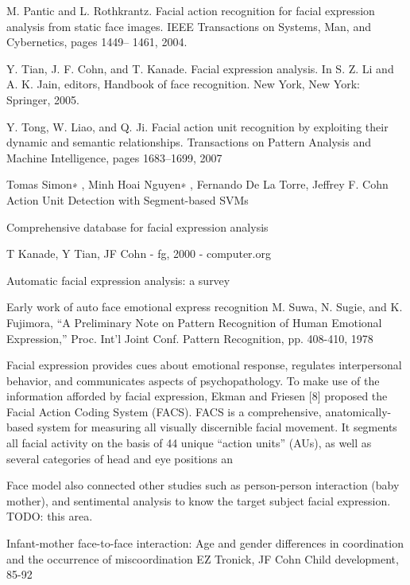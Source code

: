 M. Pantic and L. Rothkrantz. Facial action recognition for facial
expression analysis from static face images. IEEE Transactions
on Systems, Man, and Cybernetics, pages 1449–
1461, 2004.

 Y. Tian, J. F. Cohn, and T. Kanade. Facial expression analysis.
In S. Z. Li and A. K. Jain, editors, Handbook of face
recognition. New York, New York: Springer, 2005.

Y. Tong, W. Liao, and Q. Ji. Facial action unit recognition by
exploiting their dynamic and semantic relationships. Transactions
on Pattern Analysis and Machine Intelligence, pages
1683–1699, 2007

Tomas Simon∗
, Minh Hoai Nguyen∗
, Fernando De La Torre, Jeffrey F. Cohn 
Action Unit Detection with Segment-based SVMs


Comprehensive database for facial expression analysis

T Kanade, Y Tian, JF Cohn - fg, 2000 - computer.org


Automatic facial expression analysis: a survey


Early work of auto face emotional express recognition
M. Suwa, N. Sugie, and K. Fujimora, “A Preliminary Note on Pattern Recognition of Human Emotional Expression,” Proc. Int’l Joint Conf. Pattern Recognition, pp. 408-410, 1978








Facial expression provides cues about emotional response,
regulates interpersonal behavior, and communicates
aspects of psychopathology. To make use of the information
afforded by facial expression, Ekman and Friesen [8] proposed
the Facial Action Coding System (FACS). FACS is
a comprehensive, anatomically-based system for measuring
all visually discernible facial movement. It segments all facial
activity on the basis of 44 unique “action units” (AUs),
as well as several categories of head and eye positions an




Face model also connected other studies such as person-person interaction (baby mother), and sentimental analysis to know the target subject facial expression.  TODO: this area.

Infant-mother face-to-face interaction: Age and gender differences in coordination and the occurrence of miscoordination
EZ Tronick, JF Cohn
Child development, 85-92








